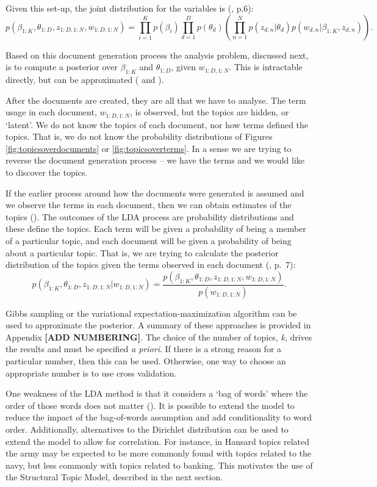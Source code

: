 \documentclass[12pt,]{article}
\theoremstyle{definition}
\theoremstyle{definition}
\theoremstyle{definition}
\theoremstyle{remark}
\begin{document}
Given this set-up, the joint distribution for the variables is
(\citet{blei2012}, p.6):
\[p(\beta_{1:K}, \theta_{1:D}, z_{1:D, 1:N}, w_{1:D, 1:N}) = \prod^{K}_{i=1}p(\beta_i) \prod^{D}_{d=1}p(\theta_d) \left(\prod^N_{n=1}p(z_{d,n}|\theta_d)p\left(w_{d,n}|\beta_{1:K},z_{d,n}\right) \right).\]

Based on this document generation process the analysis problem,
discussed next, is to compute a posterior over \(\beta_{1:K}\) and
\(\theta_{1:D}\), given \(w_{1:D, 1:N}\). This is intractable directly,
but can be approximated (\citet{GriffithsSteyvers2004} and
\citet{blei2012}).

After the documents are created, they are all that we have to analyse.
The term usage in each document, \(w_{1:D, 1:N}\), is observed, but the
topics are hidden, or `latent'. We do not know the topics of each
document, nor how terms defined the topics. That is, we do not know the
probability distributions of Figures \ref{fig:topicsoverdocuments} or
\ref{fig:topicsoverterms}. In a sense we are trying to reverse the
document generation process -- we have the terms and we would like to
discover the topics.

If the earlier process around how the documents were generated is
assumed and we observe the terms in each document, then we can obtain
estimates of the topics (\citet{SteyversGriffiths2006}). The outcomes of
the LDA process are probability distributions and these define the
topics. Each term will be given a probability of being a member of a
particular topic, and each document will be given a probability of being
about a particular topic. That is, we are trying to calculate the
posterior distribution of the topics given the terms observed in each
document (\citet{blei2012}, p.~7):
\[p(\beta_{1:K}, \theta_{1:D}, z_{1:D, 1:N} | w_{1:D, 1:N}) = \frac{p\left(\beta_{1:K}, \theta_{1:D}, z_{1:D, 1:N}, w_{1:D, 1:N}\right)}{p(w_{1:D, 1:N})}.\]

Gibbs sampling or the variational expectation-maximization algorithm can
be used to approximate the posterior. A summary of these approaches is
provided in Appendix \textbf{{[}ADD NUMBERING{]}}. The choice of the
number of topics, \emph{k}, drives the results and must be specified
\emph{a priori}. If there is a strong reason for a particular number,
then this can be used. Otherwise, one way to choose an appropriate
number is to use cross validation.

One weakness of the LDA method is that it considers a `bag of words'
where the order of those words does not matter (\citet{blei2012}). It is
possible to extend the model to reduce the impact of the bag-of-words
assumption and add conditionality to word order. Additionally,
alternatives to the Dirichlet distribution can be used to extend the
model to allow for correlation. For instance, in Hansard topics related
the army may be expected to be more commonly found with topics related
to the navy, but less commonly with topics related to banking. This
motivates the use of the Structural Topic Model, described in the next
section.
\end{document}
